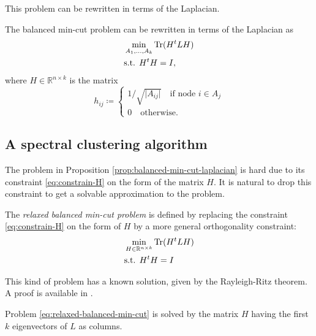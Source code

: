 \documentclass[../../main.tex]{subfiles} %
\begin{document}
This problem can be rewritten in terms of the Laplacian.
\begin{proposition}  %
The balanced min-cut problem can be rewritten in terms of the Laplacian as
\begin{equation}
	\begin{aligned}
	    &\min_{A_1, \dots, A_k} \textup{Tr} (H^t L H) \\
	    &\text{s.t. } H^t H = I,
	\end{aligned}
	\label{eq:laplacian-balanced-min-cut}
\end{equation}
where \(H \in \mathbb R^{n \times k}\) is the matrix
\begin{equation}
	h_{ij} \coloneqq \begin{cases}
		1/\sqrt{\vert A_{ij} \vert} \quad \text{if node } i \in A_j \\
		0 \quad \text{otherwise.}  
	\end{cases}
\label{eq:constrain-H}
\end{equation}
\label{prop:balanced-min-cut-laplacian}
\end{proposition}

\subsection{A spectral clustering algorithm}
The problem in Proposition \ref{prop:balanced-min-cut-laplacian} is hard 
due to its constraint \eqref{eq:constrain-H} on the form of the matrix 
\(H\). It is natural to drop this constraint to get a solvable approximation to the 
problem.
\begin{definition}  %
The \textit{relaxed balanced min-cut problem} is defined by replacing the 
constraint \eqref{eq:constrain-H} on the form of \(H\) by a more general 
orthogonality constraint:
	\begin{equation}
		\begin{aligned}
			&\min_{H \in \mathbb R^{n \times k}} \textup{Tr} (H^t L H) \\
			&\text{s.t. } H^t H = I
		\end{aligned}
		\label{eq:relaxed-balanced-min-cut}
	\end{equation}
\end{definition}
This kind of problem has a known solution, given by the Rayleigh-Ritz 
theorem. 
A proof is available in \cite{l1996handbook}.
\begin{proposition}
	Problem \eqref{eq:relaxed-balanced-min-cut} is solved by the matrix \(H\) 
	having the first \(k\) eigenvectors of \(L\) as columns.
\end{proposition}
\end{document}
